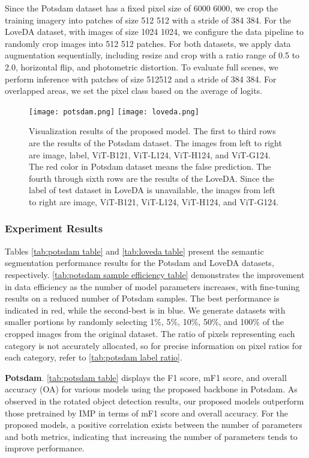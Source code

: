Since the Potsdam dataset has a fixed pixel size of 6000  6000, we crop the training imagery into patches of size 512  512 with a stride of 384  384. For the LoveDA dataset, with images of size 1024  1024, we configure the data pipeline to randomly crop images into 512  512 patches. For both datasets, we apply data augmentation sequentially, including resize and crop with a ratio range of 0.5 to 2.0, horizontal flip, and photometric distortion. To evaluate full scenes, we perform inference with patches of size 512512 and a stride of 384  384. For overlapped areas, we set the pixel class based on the average of logits.

\begin{figure*}[p!tb]{}
    \centering
    \texttt{[image: potsdam.png]}
    \texttt{[image: loveda.png]}
    \caption{Visualization results of the proposed model. The first to third rows are the results of the Potsdam dataset. The images from left to right are image, label, ViT-B121, ViT-L124, ViT-H124, and ViT-G124. The red color in Potsdam dataset means the false prediction. The fourth through sixth rows are the results of the LoveDA. Since the label of test dataset in LoveDA is unavailable, the images from left to right are image, ViT-B121, ViT-L124, ViT-H124, and ViT-G124.}
    \label{fig:vis_semantic_seg}
\end{figure*}

\subsubsection{Experiment Results}
Tables \autoref{tab:potsdam table} and \autoref{tab:loveda table} present the semantic segmentation performance results for the Potsdam and LoveDA datasets, respectively. \autoref{tab:potsdam sample efficiency table} demonstrates the improvement in data efficiency as the number of model parameters increases, with fine-tuning results on a reduced number of Potsdam samples. The best performance is indicated in red, while the second-best is in blue. We generate datasets with smaller portions by randomly selecting 1\%, 5\%, 10\%, 50\%, and 100\% of the cropped images from the original dataset. The ratio of pixels representing each category is not accurately allocated, so for precise information on pixel ratios for each category, refer to \autoref{tab:potsdam label ratio}.

\textbf{Potsdam}. \autoref{tab:potsdam table} displays the F1 score, mF1 score, and overall accuracy (OA) for various models using the proposed backbone in Potsdam. As observed in the rotated object detection results, our proposed models outperform those pretrained by IMP in terms of mF1 score and overall accuracy. For the proposed models, a positive correlation exists between the number of parameters and both metrics, indicating that increasing the number of parameters tends to improve performance.

